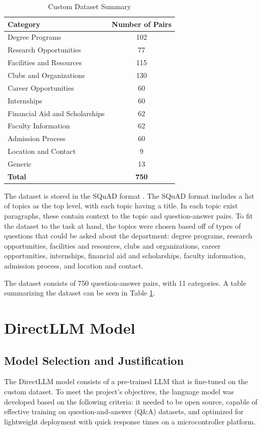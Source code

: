 \documentclass[conference]{IEEEtran}
\begin{document}
\begin{table}[!h]
    \centering
    \caption{Custom Dataset Summary}
    \begin{tabular}{l|c}
        \toprule
        \textbf{Category} & \textbf{Number of Pairs} \\
        \midrule
        Degree Programs & 102 \\
        Research Opportunities & 77 \\
        Facilities and Resources & 115 \\
        Clubs and Organizations & 130 \\
        Career Opportunities & 60 \\
        Internships & 60 \\
        Financial Aid and Scholarships & 62 \\
        Faculty Information & 62 \\
        Admission Process & 60 \\
        Location and Contact & 9 \\
        Generic & 13 \\
        \bottomrule
        \textbf{Total} & \textbf{750} \\
    \end{tabular}
    \label{tab:dataset}
\end{table}

The dataset is stored in the SQuAD format \cite{b7}. 
The SQuAD format includes a list of topics as the top level, with each topic having a title. 
In each topic exist paragraphs, these contain context to the topic and question-answer pairs.
To fit the dataset to the task at hand, the topics were chosen based off of types of questions that could be asked about the department:
degree programs, research opportunities, facilities and resources, clubs and organizations, career opportunities, internships, financial aid and scholarships, faculty information, admission process, and location and contact.

The dataset consists of 750 question-answer pairs, with 11 categories.
A table summarizing the dataset can be seen in Table \ref{tab:dataset}.

\section{DirectLLM Model}
\subsection{Model Selection and Justification}
The DirectLLM model consists of a pre-trained LLM that is fine-tuned on the custom dataset.
To meet the project's objectives, the language model was developed based on the following criteria: it needed to be open source, capable of effective training on question-and-answer (Q\&A) datasets, and optimized for lightweight deployment with quick response times on a microcontroller platform.
\end{document}
